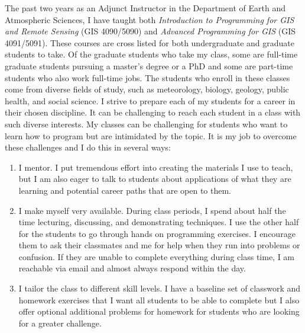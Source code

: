 \documentclass{res}
\begin{document}
\begin{resume}
\par The past two years as an Adjunct Instructor in the Department of Earth and Atmospheric Sciences, I have taught both \textit{Introduction to Programming for GIS and Remote Sensing} (GIS 4090/5090) and \textit{Advanced Programming for GIS} (GIS 4091/5091). These courses are cross listed for both undergraduate and graduate students to take. Of the graduate students who take my class, some are full-time graduate students pursuing a master’s degree or a PhD and some are part-time students who also work full-time jobs. The students who enroll in these classes come from diverse fields of study, such as meteorology, biology, geology, public health, and social science. I strive to prepare each of my students for a career in their chosen discipline. It can be challenging to reach each student in a class with such diverse interests. My classes can be challenging for students who want to learn how to program but are intimidated by the topic. It is my job to overcome these challenges and I do this in several ways:
\newline
\begin{enumerate}
\item I mentor. I put tremendous effort into creating the materials I use to teach, but I am also eager to talk to students about applications of what they are learning and potential career paths that are open to them. 
\item I make myself very available. During class periods, I spend about half the time lecturing, discussing, and demonstrating techniques. I use the other half for the students to go through hands on programming exercises. I encourage them to ask their classmates and me for help when they run into problems or confusion. If they are unable to complete everything during class time, I am reachable via email and almost always respond within the day.
\item I tailor the class to different skill levels. I have a baseline set of classwork and homework exercises that I want all students to be able to complete but I also offer optional additional problems for homework for students who are looking for a greater challenge.

\end{enumerate}
\end{resume}
\end{document}
